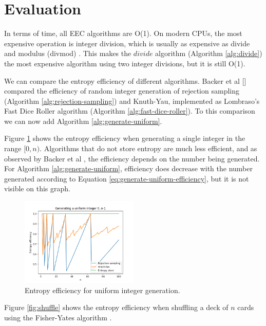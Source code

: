 \documentclass[12pt]{article}
\begin{document}
\section {Evaluation}


In terms of time, all EEC algorithms are O(1). On modern CPUs, the most expensive operation is integer division, which is usually as expensive as divide and modulus (divmod) \cite{cpudivmod}. This makes the $divide$ algorithm (Algorithm \ref{alg:divide}) the most expensive algorithm using two integer divisions, but it is still O(1).




We can compare the entropy efficiency of different algorithms. Backer et al [] compared the efficiency of random integer generation of rejection sampling (Algorithm \ref{alg:rejection-sampling}) and Knuth-Yau, implemented as Lombraso's Fast Dice Roller algorithm (Algorithm \ref{alg:fast-dice-roller}). To this comparison we can now add Algorithm \ref{alg:generate-uniform}.

Figure \ref{fig:uniform} shows the entropy efficiency when generating a single integer in the range $[0,n)$.  Algorithms that do not store entropy are much less efficient, and as observed by Backer et al \cite{todo}, the efficiency depends on the number being generated. For Algorithm \ref{alg:generate-uniform}, efficiency does decrease with the number generated according to Equation \ref{eq:generate-uniform-efficiency}, but it is not visible on this graph.

\begin{figure}[ht]
\centering
\includegraphics[width=0.5\textwidth]{uniform_efficiency.png}
\caption{Entropy efficiency for uniform integer generation.}
\label{fig:uniform}
\end{figure}

Figure \ref{fig:shuffle} shows the entropy efficiency when shuffling a deck of $n$ cards using the Fisher-Yates algorithm \cite{fisher-yates}.
\end{document}
